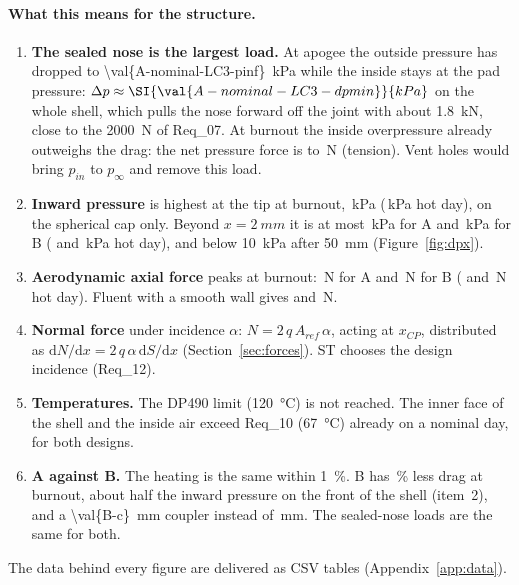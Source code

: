 \paragraph{What this means for the structure.}
\begin{enumerate}
\item \textbf{The sealed nose is the largest load.} At apogee the outside pressure has dropped to
\SI{\val{A-nominal-LC3-pinf}}{kPa} while the inside stays at the pad pressure: $\Delta p \approx
\SI{\val{A-nominal-LC3-dpmin}}{kPa}$ on the whole shell, which pulls the nose forward off the joint with
about \SI{1.8}{kN}, close to the \SI{2000}{N} of Req\_07. At burnout the inside overpressure already
outweighs the drag: the net pressure force is  to \,N
(tension). Vent holes would bring $p_{in}$ to $p_\infty$ and remove this load.
\item \textbf{Inward pressure} is highest at the tip at burnout, \,kPa
(\,kPa hot day), on the spherical cap only. Beyond $x = \SI{2}{mm}$ it is at most
\,kPa for A and \,kPa for B ( and
\,kPa hot day), and below \SI{10}{kPa} after \SI{50}{mm} (Figure~\ref{fig:dpx}).
\item \textbf{Aerodynamic axial force} peaks at burnout: \,N for A and
\,N for B ( and \,N hot day). Fluent with a
smooth wall gives  and \,N.
\item \textbf{Normal force} under incidence $\alpha$: $N = 2\,q\,A_{ref}\,\alpha$, acting at $x_{CP}$,
distributed as $\mathrm{d}N/\mathrm{d}x = 2\,q\,\alpha\,\mathrm{d}S/\mathrm{d}x$ (Section~\ref{sec:forces}).
ST chooses the design incidence (Req\_12).
\item \textbf{Temperatures.} The DP490 limit (\SI{120}{\celsius}) is not reached. The inner face of the
shell and the inside air exceed Req\_10 (\SI{67}{\celsius}) already on a nominal day, for both designs.
\item \textbf{A against B.} The heating is the same within \SI{1}{\percent}. B has \,\% less
drag at burnout, about half the inward pressure on the front of the shell (item~2), and a
\SI{\val{B-c}}{mm} coupler instead of \,mm. The sealed-nose loads are the same for both.
\end{enumerate}

The data behind every figure are delivered as CSV tables (Appendix~\ref{app:data}).

